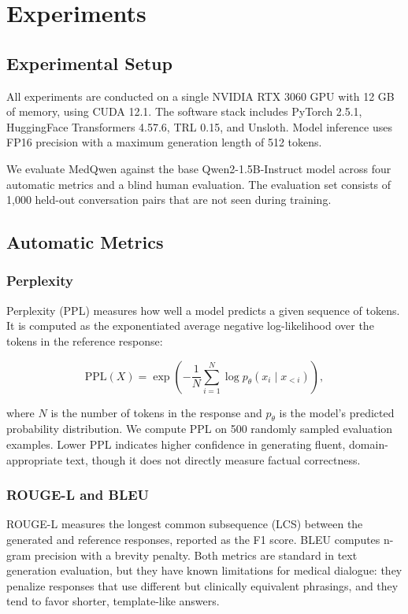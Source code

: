 \documentclass[12pt,a4paper]{article}
\begin{document}
\section{Experiments}
\label{sec:experiments}

\subsection{Experimental Setup}

All experiments are conducted on a single NVIDIA RTX 3060 GPU with 12 GB of memory, using CUDA 12.1. The software stack includes PyTorch 2.5.1, HuggingFace Transformers 4.57.6, TRL 0.15, and Unsloth. Model inference uses FP16 precision with a maximum generation length of 512 tokens.

We evaluate MedQwen against the base Qwen2-1.5B-Instruct model across four automatic metrics and a blind human evaluation. The evaluation set consists of 1,000 held-out conversation pairs that are not seen during training.

\subsection{Automatic Metrics}

\subsubsection{Perplexity}

Perplexity (PPL) measures how well a model predicts a given sequence of tokens. It is computed as the exponentiated average negative log-likelihood over the tokens in the reference response:

\begin{equation}
\text{PPL}(X) = \exp\left(-\frac{1}{N}\sum_{i=1}^{N} \log p_\theta(x_i \mid x_{<i})\right),
\end{equation}

where $N$ is the number of tokens in the response and $p_\theta$ is the model's predicted probability distribution. We compute PPL on 500 randomly sampled evaluation examples. Lower PPL indicates higher confidence in generating fluent, domain-appropriate text, though it does not directly measure factual correctness.

\subsubsection{ROUGE-L and BLEU}

ROUGE-L measures the longest common subsequence (LCS) between the generated and reference responses, reported as the F1 score. BLEU computes n-gram precision with a brevity penalty. Both metrics are standard in text generation evaluation, but they have known limitations for medical dialogue: they penalize responses that use different but clinically equivalent phrasings, and they tend to favor shorter, template-like answers.
\end{document}
